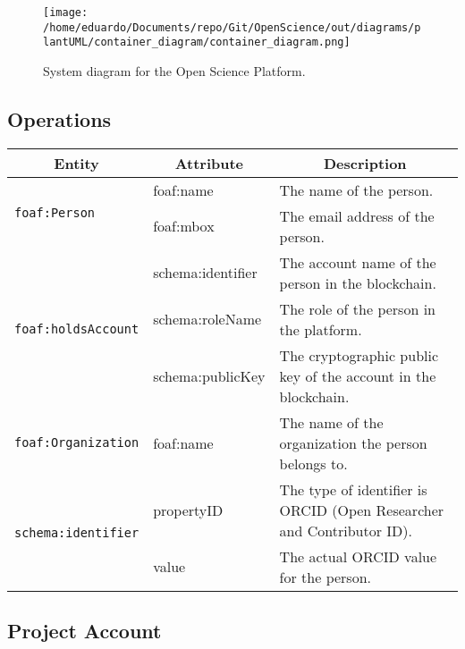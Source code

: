 \documentclass{article}
\begin{document}
\vspace{1cm}
    
\begin{figure}[H]
    \centering
    \texttt{[image: /home/eduardo/Documents/repo/Git/OpenScience/out/diagrams/plantUML/container\_diagram/container\_diagram.png]}  %
    \caption{System diagram for the Open Science Platform.}
    \label{fig:container-diagram}
\end{figure}


\subsection{Operations}


\begin{longtable}{|l|l|p{8cm}|}
    \hline
    \multicolumn{1}{|c|}{\textbf{Entity}} & 
    \multicolumn{1}{c|}{\textbf{Attribute}} & 
    \multicolumn{1}{c|}{\textbf{Description}} \\
    \hline
    \multirow{2}{*}{\texttt{foaf:Person}}  
        & foaf:name & The name of the person. \\ \cline{2-3}
        & foaf:mbox & The email address of the person. \\ \cline{2-3} 
    \hline
    \multirow{3}{*}{\texttt{foaf:holdsAccount}}  
        & schema:identifier & The account name of the person in the blockchain. \\ \cline{2-3}
        & schema:roleName & The role of the person in the platform. \\ \cline{2-3}
        & schema:publicKey & The cryptographic public key of the account in the blockchain. \\ 
    \hline
    \multirow{1}{*}{\texttt{foaf:Organization}}  
        & foaf:name & The name of the organization the person belongs to. \\ \cline{1-3}
         
    \hline
    \multirow{2}{*}{\texttt{schema:identifier}}  
        & propertyID & The type of identifier is ORCID (Open Researcher and Contributor ID). \\ \cline{2-3}
        & value & The actual ORCID value for the person. \\ 
    \hline
    \end{longtable}
    
\subsection{Project Account}
\end{document}
